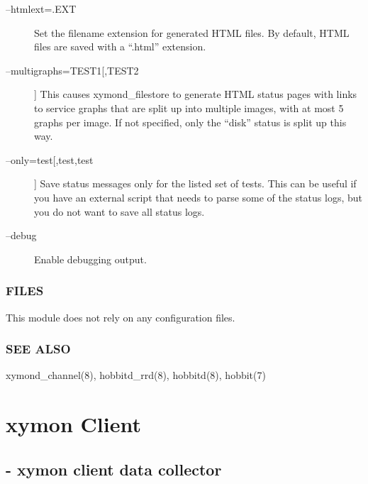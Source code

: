 \begin{description}
 

\item[--htmlext=.EXT] Set the filename extension for generated HTML files. By default, HTML files are saved with a ``.html'' extension. 

 

\item[--multigraphs=TEST1[,TEST2]] This causes xymond\_filestore to generate HTML status pages with links to service graphs that are split up into multiple images, with at most 5 graphs per image. If not specified, only the ``disk'' status is split up this way. 

 

\item[--only=test[,test,test]] Save status messages only for the listed set of tests. This can be useful if you have an external script that needs to parse some of the status logs, but you do not want to save all status logs. 

 

\item[--debug] Enable debugging output. 

 


\end{description}
\subsection{FILES}
 This module does not rely on any configuration files. 

 
\subsection{SEE ALSO}
xymond\_channel(8), hobbitd\_rrd(8), hobbitd(8), hobbit(7) 

 
  
%
\chapter{xymon Client}

%
\section{ - xymon client data collector }

